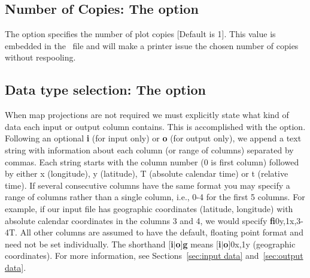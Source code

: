 \subsection{Number of Copies: The  option}

The  option specifies the number of plot copies [Default is 1].  This
value is embedded in the \PS\ file and will make a printer issue the chosen
number of copies without respooling.

\subsection{Data type selection: The  option}

When map projections are not required we must explicitly state
what kind of data each input or output column contains.  This is accomplished with
the  option.  Following an optional \textbf{i} (for input only) or \textbf{o} (for output
only), we append a text string with information about each column (or range of columns) separated by commas.
Each string starts with the column number (0 is first column) followed by either
x (longitude), y (latitude), T (absolute calendar time) or t (relative time).  If
several consecutive columns have the same format you may specify a range of columns
rather than a single column, i.e., 0-4 for the first 5 columns.  For example, if our
input file has geographic coordinates (latitude, longitude) with absolute calendar
coordinates in the columns 3 and 4, we would specify \textbf{fi}0y,1x,3-4T.  All other columns
are assumed to have the default, floating point format and need not be set individually.
The shorthand [\textbf{i}$|$\textbf{o}]\textbf{g} means [\textbf{i}$|$\textbf{o}]0x,1y (geographic coordinates).
For more information, see Sections~\ref{sec:input data} and~\ref{sec:output data}.

